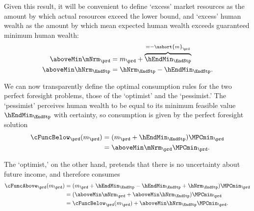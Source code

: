   Given this result, it will be convenient to define `excess' market
  resources as the amount by which actual resources exceed the lower
  bound, and `excess' human wealth as the amount by which mean expected human wealth
  exceeds guaranteed minimum human wealth:
  \begin{equation*}\begin{gathered}\begin{aligned}
        \aboveMin \mNrm_{\prd}  & = m_{\prd}+\overbrace{\hEndMin_{\EndStp}}^{=-\ushort{m}_{\prd}}
        \\  \aboveMin \hNrm_{\EndStp}  & = \hNrm_{\EndStp}-\hEndMin_{\EndStp}.
      \end{aligned}\end{gathered}\end{equation*}

  We can now transparently define the optimal
  consumption rules for the two perfect foresight problems, those of the
  `optimist' and the `pessimist.'  The `pessimist' perceives human
  wealth to be equal to its minimum feasible value $\hEndMin_{\EndStp}$ with certainty, so
  consumption is given by the perfect foresight solution
  \begin{equation*}\begin{gathered}\begin{aligned}
        \cFuncBelow_{\prd}(m_{\prd})  & = (m_{\prd}+\hEndMin_{\EndStp})\MPCmin_{\prd}
        \\  & = \aboveMin \mNrm_{\prd}\MPCmin_{\prd}
        .
      \end{aligned}\end{gathered}\end{equation*}

  The `optimist,' on the other hand, pretends that there is no uncertainty
  about future income, and therefore consumes
  \begin{equation*}\begin{gathered}\begin{aligned}
        \cFuncAbove_{\prd}(m_{\prd})  & = (m_{\prd} +\hEndMin_{\EndStp} - \hEndMin_{\EndStp} + \hNrm_{\EndStp} )\MPCmin_{\prd}
        \\    & = (\aboveMin \mNrm_{\prd} + \aboveMin \hNrm_{\EndStp})\MPCmin_{\prd}
        \\      & = \cFuncBelow_{\prd}(m_{\prd})+\aboveMin \hNrm_{\EndStp} \MPCmin_{\prd}
        .
      \end{aligned}\end{gathered}\end{equation*}

